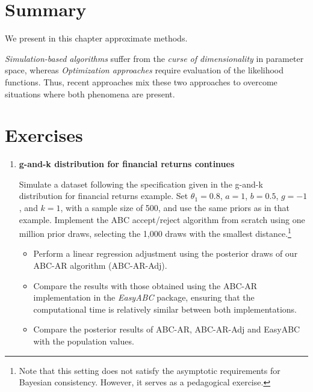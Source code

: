 \section{Summary}\label{sec15_3}
We present in this chapter approximate methods.

\textit{Simulation-based algorithms} suffer from the \textit{curse of dimensionality} in parameter space, whereas \textit{Optimization approaches} require evaluation of the likelihood functions. Thus, recent approaches mix these two approaches to overcome situations where both phenomena are present.

\section{Exercises}\label{sec15_4}

\begin{enumerate}
	\item \textbf{g-and-k distribution for financial returns continues}
	
	Simulate a dataset following the specification given in the g-and-k distribution for financial returns example. Set $\theta_1 = 0.8$, $a = 1$, $b = 0.5$, $g = -1$, and $k = 1$, with a sample size of 500, and use the same priors as in that example. Implement the ABC accept/reject algorithm from scratch using one million prior draws, selecting the 1,000 draws with the smallest distance.\footnote{Note that this setting does not satisfy the asymptotic requirements for Bayesian consistency. However, it serves as a pedagogical exercise.}
	
	\begin{itemize}
		\item Perform a linear regression adjustment using the posterior draws of our ABC-AR algorithm (ABC-AR-Adj).
		\item Compare the results with those obtained using the ABC-AR implementation in the \textit{EasyABC} package, ensuring that the computational time is relatively similar between both implementations.
		\item Compare the posterior results of ABC-AR, ABC-AR-Adj and EasyABC with the population values.
	\end{itemize}
	

\end{enumerate}
